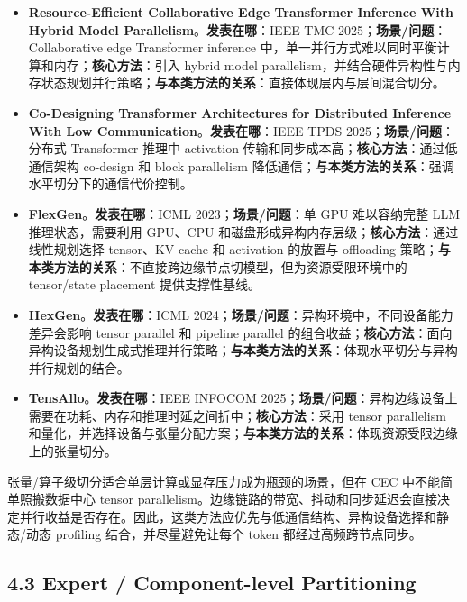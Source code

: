 \documentclass[a4paper,twocolumn,10pt]{ctexart}
\begin{document}
\begin{itemize}
\item \textbf{Resource-Efficient Collaborative Edge Transformer Inference With Hybrid Model Parallelism}。\textbf{发表在哪}：IEEE TMC 2025；\textbf{场景/问题}：Collaborative edge Transformer inference 中，单一并行方式难以同时平衡计算和内存；\textbf{核心方法}：引入 hybrid model parallelism，并结合硬件异构性与内存状态规划并行策略；\textbf{与本类方法的关系}：直接体现层内与层间混合切分。
\item \textbf{Co-Designing Transformer Architectures for Distributed Inference With Low Communication}。\textbf{发表在哪}：IEEE TPDS 2025；\textbf{场景/问题}：分布式 Transformer 推理中 activation 传输和同步成本高；\textbf{核心方法}：通过低通信架构 co-design 和 block parallelism 降低通信；\textbf{与本类方法的关系}：强调水平切分下的通信代价控制。
\item \textbf{FlexGen}。\textbf{发表在哪}：ICML 2023；\textbf{场景/问题}：单 GPU 难以容纳完整 LLM 推理状态，需要利用 GPU、CPU 和磁盘形成异构内存层级；\textbf{核心方法}：通过线性规划选择 tensor、KV cache 和 activation 的放置与 offloading 策略；\textbf{与本类方法的关系}：不直接跨边缘节点切模型，但为资源受限环境中的 tensor/state placement 提供支撑性基线。
\item \textbf{HexGen}。\textbf{发表在哪}：ICML 2024；\textbf{场景/问题}：异构环境中，不同设备能力差异会影响 tensor parallel 和 pipeline parallel 的组合收益；\textbf{核心方法}：面向异构设备规划生成式推理并行策略；\textbf{与本类方法的关系}：体现水平切分与异构并行规划的结合。
\item \textbf{TensAllo}。\textbf{发表在哪}：IEEE INFOCOM 2025；\textbf{场景/问题}：异构边缘设备上需要在功耗、内存和推理时延之间折中；\textbf{核心方法}：采用 tensor parallelism 和量化，并选择设备与张量分配方案；\textbf{与本类方法的关系}：体现资源受限边缘上的张量切分。
\end{itemize}





张量/算子级切分适合单层计算或显存压力成为瓶颈的场景，但在 CEC 中不能简单照搬数据中心 tensor parallelism。边缘链路的带宽、抖动和同步延迟会直接决定并行收益是否存在。因此，这类方法应优先与低通信结构、异构设备选择和静态/动态 profiling 结合，并尽量避免让每个 token 都经过高频跨节点同步。


\subsection{4.3 Expert / Component-level Partitioning}
\end{document}
